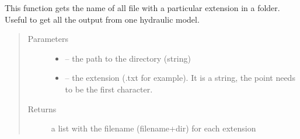 \documentclass[letterpaper,10pt,english]{sphinxmanual}
\begin{document}
\begin{fulllineitems}
\label{\detokenize{index:src.load_hdf5.get_all_filename}}
This function gets the name of all file with a particular extension in a folder. Useful to get all the output
from one hydraulic model.
\begin{quote}\begin{description}
\item[{Parameters}] \leavevmode\begin{itemize}
\item {} 
 -- the path to the directory (string)

\item {} 
 -- the extension (.txt for example). It is a string, the point needs to be the first character.

\end{itemize}

\item[{Returns}] \leavevmode
a list with the filename (filename+dir) for each extension

\end{description}\end{quote}

\end{fulllineitems}

\end{document}
